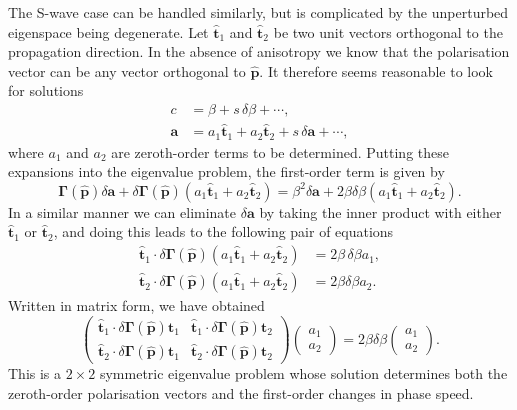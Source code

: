 \documentclass [a4paper,12pt]{paper}
\begin{document}
The S-wave case can be handled similarly, but is complicated by the unperturbed eigenspace being degenerate. Let $\hat{\mathbf{t}}_{1}$ 
and $\hat{\mathbf{t}}_{2}$ be two unit vectors orthogonal to the propagation direction. In the absence of anisotropy we know that 
the polarisation vector can be any vector orthogonal to $\hat{\mathbf{p}}$. It therefore seems reasonable to look for solutions
\begin{align}
c&=\beta+s\,\delta\beta+\cdots, \\
\mathbf{a}&=a_{1}\hat{\mathbf{t}}_{1}+a_{2}\hat{\mathbf{t}}_{2}+s\,\delta \mathbf{a}+\cdots,
\end{align}
where $a_{1}$ and $a_{2}$ are zeroth-order terms to be determined. Putting these expansions into the eigenvalue problem, the 
first-order term is given by
\begin{equation}
\bm{\Gamma}(\hat{\mathbf{p}})\delta \mathbf{a}+\delta\bm{\Gamma}(\hat{\mathbf{p}})(a_{1}\hat{\mathbf{t}}_{1}+
a_{2}\hat{\mathbf{t}}_{2})=\beta^{2}\delta \mathbf{a}+2\beta\delta\beta(a_{1}\hat{\mathbf{t}}_{1}+a_{2}\hat{\mathbf{t}}_{2}).
\end{equation}
In a similar manner we can eliminate $\delta \mathbf{a}$ by taking the inner product with either $\hat{\mathbf{t}}_{1}$ or 
$\hat{\mathbf{t}}_{2}$, and doing this leads to the following pair of equations
\begin{align}
\hat{\mathbf{t}}_{1}\cdot\delta\bm{\Gamma}(\hat{\mathbf{p}})(a_{1}\hat{\mathbf{t}}_{1}+a_{2}\hat{\mathbf{t}}_{2})&=2\beta\,\delta\beta a_{1}, \\
\hat{\mathbf{t}}_{2}\cdot\delta\bm{\Gamma}(\hat{\mathbf{p}})(a_{1}\hat{\mathbf{t}}_{1}+a_{2}\hat{\mathbf{t}}_{2})&=2\beta\delta\beta a_{2}.
\end{align}
Written in matrix form, we have obtained
\begin{equation}
\begin{pmatrix} \hat{\mathbf{t}}_{1}\cdot\delta\bm{\Gamma}(\hat{\mathbf{p}})\hat{\mathbf{t}}_{1} & \hat{\mathbf{t}}_{1}
    \cdot\delta\bm{\Gamma}(\hat{\mathbf{p}})\hat{\mathbf{t}}_{2} \\ \hat{\mathbf{t}}_{2}\cdot\delta\bm{\Gamma}(\hat{\mathbf{p}})\hat{\mathbf{t}}_{1} & 
    \hat{\mathbf{t}}_{2}\cdot\delta\bm{\Gamma}(\hat{\mathbf{p}})\hat{\mathbf{t}}_{2} \end{pmatrix} \begin{pmatrix} a_{1}
         \\ a_{2} \end{pmatrix} = 2\beta\delta\beta \begin{pmatrix} a_{1} \\ a_{2} \end{pmatrix}.
\end{equation}
This is a $2\times2$ symmetric eigenvalue problem whose solution determines both the zeroth-order polarisation vectors 
and the first-order changes in phase speed. 
\end{document}
